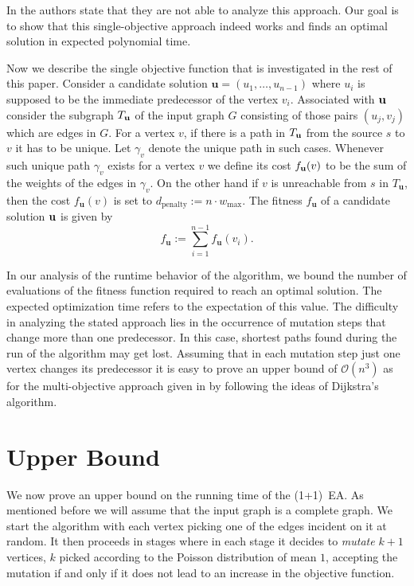 \documentclass{sig-alternate}
\newcommand{\oneoneea}{(1+1)~EA\xspace}
\newcommand{\Oh}{\ensuremath{\mathcal{O}}}
\begin{document}
In \cite{spea04} the authors state that they are not able to analyze this approach.
Our goal is to show that this single-objective approach indeed works and
finds an optimal solution in expected polynomial time. 

Now we describe the single objective function that is investigated
in the rest of this paper. Consider a candidate solution
$\mathbf{u}=(u_1,\ldots,u_{n-1})$ where $u_i$ is supposed to be the
immediate predecessor of the vertex $v_i$. Associated with $\bf{u}$
consider the subgraph $T_{\bf{u}}$ of the input graph $G$ consisting
of those pairs $(u_j,v_j)$ which are edges in $G$. For a vertex $v$, if
there is a path in $T_{\bf{u}}$ from the source $s$ to $v$ it has to
be unique. Let $\gamma_v$ denote the unique path in such
cases. Whenever such unique path $\gamma_v$ exists for a vertex $v$ we
define its cost $f_{\bf{u}}(v)$ to be the sum of the weights of the
edges in $\gamma_v$. On the other hand if $v$ is unreachable from $s$
in $T_{\mathbf{u}}$, then the cost $f_{\mathbf{u}}(v)$ is set to
$d_{\mathrm{penalty}} := n \cdot w_{\mathrm{max}}$.  The
fitness $f_{\mathbf{u}}$ of a candidate solution ${\bf u}$ is given by
\[
 f_{\mathbf{u}} := \sum_{i=1}^{n-1} f_{\mathbf{u}}(v_i).
\] 

In our analysis of the runtime behavior of the algorithm, we bound the number of 
evaluations of the fitness function required to reach an optimal solution. The 
expected optimization time refers to the expectation of this value. The 
difficulty in analyzing the stated approach lies in the occurrence of mutation 
steps that change more than one predecessor. In this case, shortest paths found 
during the run of the algorithm may get lost. Assuming that in each mutation 
step just one vertex changes its predecessor it is easy to prove an upper bound 
of $\Oh(n^3)$ as for the multi-objective approach given in \cite{spea04} by 
following the ideas of Dijkstra's algorithm.



\section{Upper Bound}
\label{sec:upper}
\newcommand{\node}[0]{\bullet}

\newcommand{\beginn}{\mathit{begin}}
\newcommand{\final}{\mathit{final}}

We now prove an upper bound on the running time of the \oneoneea.
As mentioned before we will assume that the
input graph is a complete graph. We start the algorithm with each vertex
picking one of the edges incident on it at random. It then proceeds in
stages where in each stage it decides to \emph{mutate} $k+1$ vertices,
$k$ picked according to the Poisson distribution of mean $1$,
accepting the mutation if and only if it does not lead to an increase in the
objective function.
\end{document}
